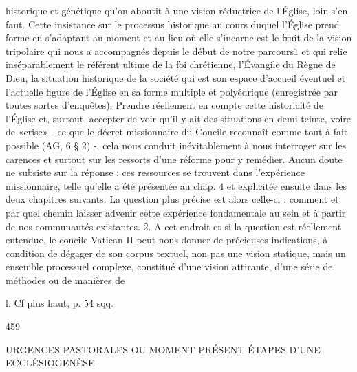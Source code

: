 {historique et génétique qu'on aboutit à une vision réductrice de l'Église, loin s'en faut.
Cette insistance sur le processus historique au cours duquel l'Église prend forme en s'adaptant au moment et au lieu où elle s'incarne est le fruit de la vision tripolaire qui nous a accompagnés depuis le début de notre parcours1 et qui relie inséparablement le référent ultime de la foi chrétienne, l'Évangile du Règne de Dieu, la situation historique de la société qui est son espace d'accueil éventuel et l'actuelle figure de l'Église en sa forme multiple et polyédrique (enregistrée par toutes sortes d'enquêtes). Prendre réellement en compte cette historicité de l'Église et, surtout, accepter de voir qu'il y ait des situations en demi-teinte, voire de «crise» - ce que le décret missionnaire du Concile reconnaît comme tout à fait possible (AG, 6 § 2) -, cela nous conduit inévitablement à nous interroger sur les carences et surtout sur les ressorts d'une réforme pour y remédier. Aucun doute ne subsiste sur la réponse : ces ressources se trouvent dans l'expérience missionnaire, telle qu'elle a été présentée au chap. 4 et explicitée ensuite dans les deux chapitres suivants. La question plus précise est alors celle-ci : comment et par quel chemin laisser advenir cette expérience fondamentale au sein et à partir de nos communautés existantes.
2.	A cet endroit et si la question est réellement entendue, le concile Vatican II peut nous donner de précieuses indications, à condition de dégager de son corpus textuel, non pas une vision statique, mais un ensemble processuel complexe, constitué d'une vision attirante, d'une série de méthodes ou de manières de

l. Cf plus haut, p. 54 sqq.

459
 
URGENCES PASTORALES OU MOMENT PRÉSENT	ÉTAPES D'UNE ECCLÉSIOGENÈSE

}

